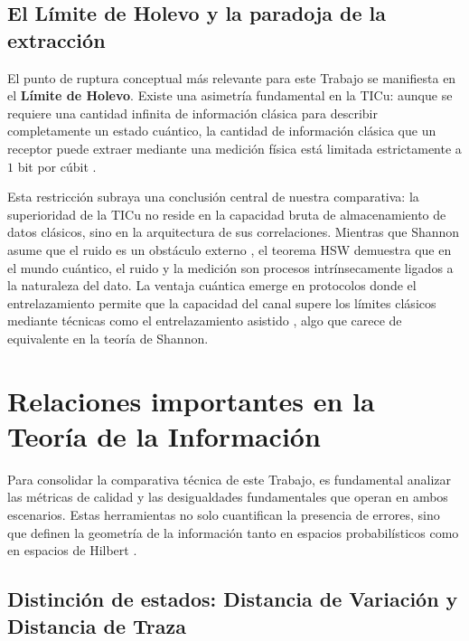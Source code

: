\documentclass[11pt,a4paper,spanish]{book}
\begin{document}
\subsection{El Límite de Holevo y la paradoja de la extracción}

El punto de ruptura conceptual más relevante para este Trabajo se manifiesta en el \textbf{Límite de Holevo}. Existe una asimetría fundamental en la TICu: aunque se requiere una cantidad infinita de información clásica para describir completamente un estado cuántico, la cantidad de información clásica que un receptor puede extraer mediante una medición física está limitada estrictamente a $1$ bit por cúbit \citep{holevo1973}.

Esta restricción subraya una conclusión central de nuestra comparativa: la superioridad de la TICu no reside en la capacidad bruta de almacenamiento de datos clásicos, sino en la arquitectura de sus correlaciones. Mientras que Shannon asume que el ruido es un obstáculo externo \citep{shannon1948}, el teorema HSW demuestra que en el mundo cuántico, el ruido y la medición son procesos intrínsecamente ligados a la naturaleza del dato. La ventaja cuántica emerge en protocolos donde el entrelazamiento permite que la capacidad del canal supere los límites clásicos mediante técnicas como el entrelazamiento asistido \citep{bennett1993}, algo que carece de equivalente en la teoría de Shannon.

\section{Relaciones importantes en la Teoría de la Información}

Para consolidar la comparativa técnica de este Trabajo, es fundamental analizar las métricas de calidad y las desigualdades fundamentales que operan en ambos escenarios. Estas herramientas no solo cuantifican la presencia de errores, sino que definen la geometría de la información tanto en espacios probabilísticos como en espacios de Hilbert \citep{nielsen2010}.

\subsection{Distinción de estados: Distancia de Variación y Distancia de Traza}
\end{document}

